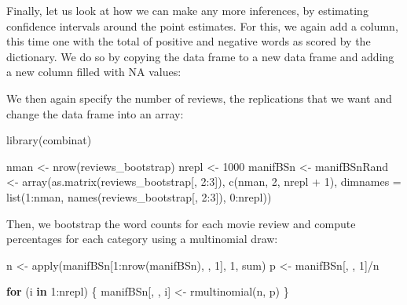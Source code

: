 \documentclass[
]{article}
\newenvironment{Shaded}{\begin{snugshade}}{\end{snugshade}}
\newcommand{\AttributeTok}[1]{\textcolor[rgb]{0.77,0.63,0.00}{#1}}
\newcommand{\ConstantTok}[1]{\textcolor[rgb]{0.00,0.00,0.00}{#1}}
\newcommand{\ControlFlowTok}[1]{\textcolor[rgb]{0.13,0.29,0.53}{\textbf{#1}}}
\newcommand{\DecValTok}[1]{\textcolor[rgb]{0.00,0.00,0.81}{#1}}
\newcommand{\FunctionTok}[1]{\textcolor[rgb]{0.00,0.00,0.00}{#1}}
\newcommand{\NormalTok}[1]{#1}
\newcommand{\OtherTok}[1]{\textcolor[rgb]{0.56,0.35,0.01}{#1}}
\newcommand{\SpecialCharTok}[1]{\textcolor[rgb]{0.00,0.00,0.00}{#1}}
\begin{document}
Finally, let us look at how we can make any more inferences, by estimating confidence intervals around the point estimates. For this, we again add a column, this time one with the total of positive and negative words as scored by the dictionary. We do so by copying the data frame to a new data frame and adding a new column filled with NA values:

\begin{Shaded}
\end{Shaded}

We then again specify the number of reviews, the replications that we want and change the data frame into an array:

\begin{Shaded}
\begin{Highlighting}[]
\FunctionTok{library}\NormalTok{(combinat)}

\NormalTok{nman }\OtherTok{\textless{}{-}} \FunctionTok{nrow}\NormalTok{(reviews\_bootstrap)}
\NormalTok{nrepl }\OtherTok{\textless{}{-}} \DecValTok{1000}
\NormalTok{manifBSn }\OtherTok{\textless{}{-}}\NormalTok{ manifBSnRand }\OtherTok{\textless{}{-}} \FunctionTok{array}\NormalTok{(}\FunctionTok{as.matrix}\NormalTok{(reviews\_bootstrap[,}
    \DecValTok{2}\SpecialCharTok{:}\DecValTok{3}\NormalTok{]), }\FunctionTok{c}\NormalTok{(nman, }\DecValTok{2}\NormalTok{, nrepl }\SpecialCharTok{+} \DecValTok{1}\NormalTok{), }\AttributeTok{dimnames =} \FunctionTok{list}\NormalTok{(}\DecValTok{1}\SpecialCharTok{:}\NormalTok{nman, }\FunctionTok{names}\NormalTok{(reviews\_bootstrap[,}
    \DecValTok{2}\SpecialCharTok{:}\DecValTok{3}\NormalTok{]), }\DecValTok{0}\SpecialCharTok{:}\NormalTok{nrepl))}
\end{Highlighting}
\end{Shaded}

Then, we bootstrap the word counts for each movie review and compute percentages for each category using a multinomial draw:

\begin{Shaded}
\begin{Highlighting}[]
\NormalTok{n }\OtherTok{\textless{}{-}} \FunctionTok{apply}\NormalTok{(manifBSn[}\DecValTok{1}\SpecialCharTok{:}\FunctionTok{nrow}\NormalTok{(manifBSn), , }\DecValTok{1}\NormalTok{], }\DecValTok{1}\NormalTok{, sum)}
\NormalTok{p }\OtherTok{\textless{}{-}}\NormalTok{ manifBSn[, , }\DecValTok{1}\NormalTok{]}\SpecialCharTok{/}\NormalTok{n}

\ControlFlowTok{for}\NormalTok{ (i }\ControlFlowTok{in} \DecValTok{1}\SpecialCharTok{:}\NormalTok{nrepl) \{}
\NormalTok{    manifBSn[, , i] }\OtherTok{\textless{}{-}} \FunctionTok{rmultinomial}\NormalTok{(n, p)}
\NormalTok{\}}
\end{Highlighting}
\end{Shaded}
\end{document}

